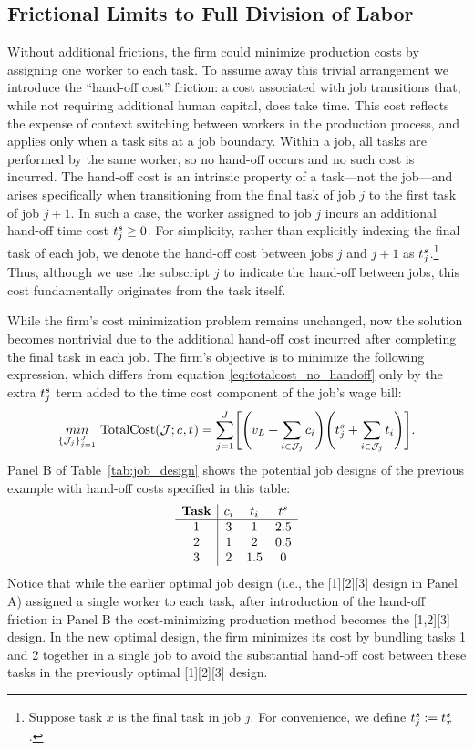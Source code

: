 \documentclass{article}
\theoremstyle{plain}
\theoremstyle{plain}
\begin{document}
\subsection{Frictional Limits to Full Division of Labor}
\label{sec:handoff_intro}
Without additional frictions, the firm could minimize production costs by assigning one worker to each task.
To assume away this trivial arrangement we introduce the ``hand-off cost” friction: a cost associated with job transitions that, while not requiring additional human capital, does take time.
This cost reflects the expense of context switching between workers in the production process, and applies only when a task sits at a job boundary.  
Within a job, all tasks are performed by the same worker, so no hand-off occurs and no such cost is incurred.
The hand-off cost is an intrinsic property of a task---not the job---and arises specifically when transitioning from the final task of job $j$ to the first task of job $j+1$.  
In such a case, the worker assigned to job $j$ incurs an additional hand-off time cost $t^{s}_{j} \ge 0$.
For simplicity, rather than explicitly indexing the final task of each job, we denote the hand-off cost between jobs $j$ and $j+1$ as $t^{s}_{j}$.\footnote{
Suppose task $x$ is the final task in job $j$.
For convenience, we define $t^{s}_{j} := t^{s}_{x}$.}
Thus, although we use the subscript $j$ to indicate the hand-off between jobs, this cost fundamentally originates from the task itself.

While the firm's cost minimization problem remains unchanged, now the solution becomes nontrivial due to the additional hand-off cost incurred after completing the final task in each job.  
The firm's objective is to minimize the following expression, which differs from equation \ref{eq:totalcost_no_handoff} only by the extra $t^{s}_{j}$ term added to the time cost component of the job's wage bill:
\begin{align}
\label{eq:totalcost_with_handoff}
\underset{\{\J_j\}_{j=1}^J}{min} \ 
\text{TotalCost}(\J; \hccost{}, \timecost{}) 
= 
\sum_{j=1}^J \Biggl[\Biggl(v_L + \sum_{i \in \J_j} \hccost{i} \Biggr) \Biggl(\handofftime{j} + \sum_{i \in \J_j} \timecost{i} \Biggr)\Biggr].
\end{align}
Panel B of Table~\ref{tab:job_design} shows the potential job designs of the previous example with hand-off costs specified in this table:
\[
\begin{array}{c|ccc}
\textbf{Task} & c_{i} & t_{i} & t^{s}_{} \\ \hline
1 & 3  & 1   & 2.5 \\
2 & 1 & 2   & 0.5 \\
3 & 2   & 1.5 & 0 \\
\end{array}
\]
Notice that while the earlier optimal job design (i.e., the [1][2][3] design in Panel A) assigned a single worker to each task, after introduction of the hand-off friction in Panel B the cost-minimizing production method becomes the [1,2][3] design.
In the new optimal design, the firm minimizes its cost by bundling tasks 1 and 2 together in a single job to avoid the substantial hand-off cost between these tasks in the previously optimal [1][2][3] design.
\end{document}
